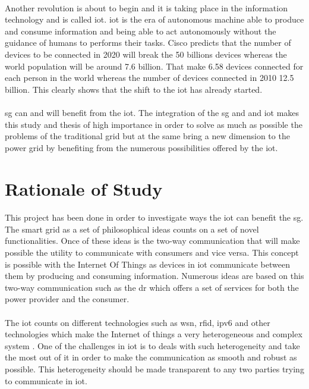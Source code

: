 \documentclass[oneside,12pt,a4paper,final]{book}
\begin{document}
\paragraph{}
Another revolution is about to begin and it is taking place in the information technology and is called \gls{iot}. \gls{iot} is the era of autonomous machine able to produce and consume information and being able to act autonomously without the guidance of humans to performs their tasks. Cisco predicts that the number of devices to be connected in 2020 will break the 50 billions devices \cite{ref3} whereas the world population will be around 7.6 billion. That make 6.58 devices connected for each person in the world whereas the number of devices connected in 2010 12.5 billion. This clearly shows that the shift to the \gls{iot} has already started.
\paragraph{}
\gls{sg} can and will benefit from the \gls{iot}. The integration of the \gls{sg} and and \gls{iot} makes this study and thesis of high importance in order to solve as much as possible the problems of the traditional grid but at the same bring a new dimension to the power grid by benefiting from the numerous possibilities offered by the \gls{iot}.

\section{Rationale of Study}
\paragraph{}
This project has been done in order to investigate ways the \gls{iot} can benefit the \gls{sg}. The smart grid as a set of philosophical ideas counts on a set of novel functionalities. Once of these ideas is the two-way communication that will make possible the utility to communicate with consumers and vice versa. This concept is possible with the Internet Of Things as devices in \gls{iot} communicate between them by producing and consuming information. Numerous ideas are based on this two-way communication such as the \gls{dr} which offers a set of services for both the power provider and the consumer.
\paragraph{}
The \gls{iot} counts on different technologies such as \gls{wsn}, \gls{rfid}, \gls{ipv6} and other technologies which make the Internet of things a very heterogeneous and complex system \cite{ref4}. One of the challenges in \gls{iot} is to deals with such heterogeneity and take the most out of it in order to make the communication as smooth and robust as possible. This heterogeneity should be made transparent to any two parties trying to communicate in \gls{iot}.
\end{document}
